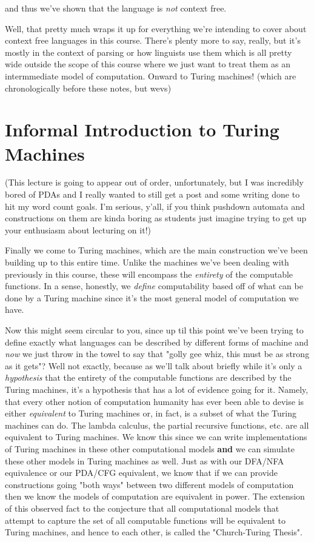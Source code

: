\documentclass[11pt]{article}
\begin{document}
and thus we've shown that the language is \emph{not} context free.

Well, that pretty much wraps it up for everything we're intending to cover about context free languages in this course. There's plenty more to say, really, but it's mostly in the context of parsing or how linguists use them which is all pretty wide outside the scope of this course where we just want to treat them as an intermmediate model of computation. Onward to Turing machines! (which are chronologically before these notes, but wevs)
\section{Informal Introduction to Turing Machines}
\label{sec-10}
(This lecture is going to appear out of order, unfortunately, but I was incredibly bored of PDAs and I really wanted to still get a post and some writing done to hit my word count goals. I'm serious, y'all, if you think pushdown automata and constructions on them are kinda boring as students just imagine trying to get up your enthusiasm about lecturing on it!)

Finally we come to Turing machines, which are the main construction we've been building up to this entire time. Unlike the machines we've been dealing with previously in this course, these will encompass the \emph{entirety} of the computable functions. In a sense, honestly, we \emph{define} computability based off of what can be done by a Turing machine since it's the most general model of computation we have. 

Now this might seem circular to you, since up til this point we've been trying to define exactly what languages can be described by different forms of machine and \emph{now} we just throw in the towel to say that "golly gee whiz, this must be as strong as it gets"? Well not exactly, because as we'll talk about briefly while it's only a \emph{hypothesis} that the entirety of the computable functions are described by the Turing machines, it's a hypothesis that has a lot of evidence going for it. Namely, that every other notion of computation humanity has ever been able to devise is either \emph{equivalent} to Turing machines or, in fact, is a subset of what the Turing machines can do. The lambda calculus, the partial recursive functions, etc. are all equivalent to Turing machines. We know this since we can write implementations of Turing machines in these other computational models \textbf{and} we can simulate these other models in Turing machines as well. Just as with our DFA/NFA equivalence or our PDA/CFG equivalent, we know that if we can provide constructions going "both ways" between two different models of computation then we know the models of computation are equivalent in power. The extension of this observed fact to the conjecture that all computational models that attempt to capture the set of all computable functions will be equivalent to Turing machines, and hence to each other, is called the "Church-Turing Thesis".
\end{document}
